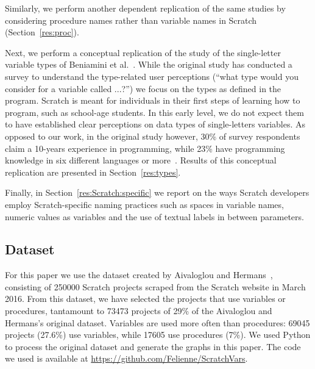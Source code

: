 \documentclass[conference]{IEEEtran}
\begin{document}
Similarly, we perform another dependent replication of the same studies by considering procedure names rather than variable names in Scratch (Section~\ref{res:proc}).

Next, we perform a conceptual replication of the study of the single-letter variable types of Beniamini et al.~\cite{Beniamini}. 
While the original study has conducted a survey to understand the type-related user perceptions (``what type would you consider for a variable called ...?'') we focus on the types as defined in the program. 
Scratch is meant for individuals in their first steps of learning how to program, such as school-age students. 
In this early level, we do not expect them to have established clear perceptions on data types of single-letters variables. 
As opposed to our work, in the original study however, 30\% of survey respondents claim a 10-years experience in programming, while  23\% have programming knowledge in six different languages or more~\cite{Beniamini}. 
Results of this conceptual replication are presented in Section~\ref{res:types}.

Finally, in Section~\ref{res:Scratch:specific} we report on the ways Scratch developers employ Scratch-specific naming practices such as spaces in variable names, numeric values as variables and the use of textual labels in between parameters.

\subsection{Dataset}
For this paper we use the dataset created by Aivaloglou and Hermans~\cite{Aivaloglou2016HowKC}, consisting of 250000 Scratch projects scraped from the Scratch website in March 2016. 
From this dataset, we have selected the projects that use variables or procedures, tantamount to 73473 projects of 29\% of the Aivaloglou and Hermans's original dataset. 
Variables are used more often than procedures: 69045 projects (27.6\%) use variables, while 17605 use procedures (7\%). 
We used Python to process the original dataset and generate the graphs in this paper. 
The code we used is available at \url{https://github.com/Felienne/ScratchVars}.
\end{document}

